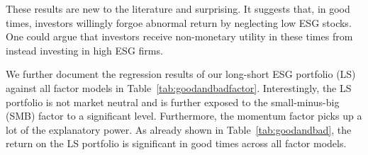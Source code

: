 \documentclass[11pt]{article}
\begin{document}
These results are new to the literature and surprising. It suggests that, in good times, investors willingly forgoe abnormal return by neglecting low ESG stocks. One could argue that investors receive non-monetary utility in these times from instead investing in high ESG firms. 

We further document the regression results of our long-short ESG portfolio (LS) against all factor models in Table~\ref{tab:goodandbadfactor}. Interestingly, the LS portfolio is not market neutral and is further exposed to the small-minus-big (SMB) factor to a significant level. Furthermore, the momentum factor picks up a lot of the explanatory power. As already shown in Table~\ref{tab:goodandbad}, the return on the LS portfolio is significant in good times across all factor models.
\end{document}

